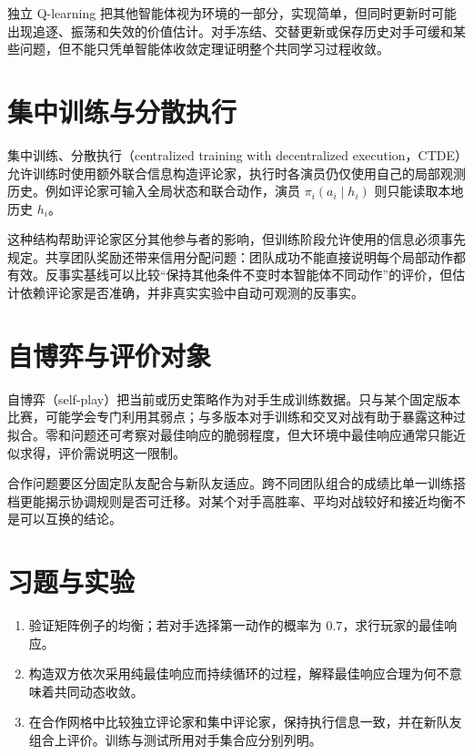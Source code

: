 独立 Q-learning 把其他智能体视为环境的一部分，实现简单，但同时更新时可能出现追逐、振荡和失效的价值估计。对手冻结、交替更新或保存历史对手可缓和某些问题，但不能只凭单智能体收敛定理证明整个共同学习过程收敛。

\section{集中训练与分散执行}

集中训练、分散执行（centralized training with decentralized execution，CTDE）允许训练时使用额外联合信息构造评论家，执行时各演员仍仅使用自己的局部观测历史。例如评论家可输入全局状态和联合动作，演员 $\pi_i(a_i\mid h_i)$ 则只能读取本地历史 $h_i$。

这种结构帮助评论家区分其他参与者的影响，但训练阶段允许使用的信息必须事先规定。共享团队奖励还带来信用分配问题：团队成功不能直接说明每个局部动作都有效。反事实基线可以比较“保持其他条件不变时本智能体不同动作”的评价，但估计依赖评论家是否准确，并非真实实验中自动可观测的反事实。

\section{自博弈与评价对象}

自博弈（self-play）把当前或历史策略作为对手生成训练数据。只与某个固定版本比赛，可能学会专门利用其弱点；与多版本对手训练和交叉对战有助于暴露这种过拟合。零和问题还可考察对最佳响应的脆弱程度，但大环境中最佳响应通常只能近似求得，评价需说明这一限制。

合作问题要区分固定队友配合与新队友适应。跨不同团队组合的成绩比单一训练搭档更能揭示协调规则是否可迁移。对某个对手高胜率、平均对战较好和接近均衡不是可以互换的结论。

\section{习题与实验}
\begin{enumerate}
\item 验证矩阵例子的均衡；若对手选择第一动作的概率为 $0.7$，求行玩家的最佳响应。
\item 构造双方依次采用纯最佳响应而持续循环的过程，解释最佳响应合理为何不意味着共同动态收敛。
\item 在合作网格中比较独立评论家和集中评论家，保持执行信息一致，并在新队友组合上评价。训练与测试所用对手集合应分别列明。
\end{enumerate}





